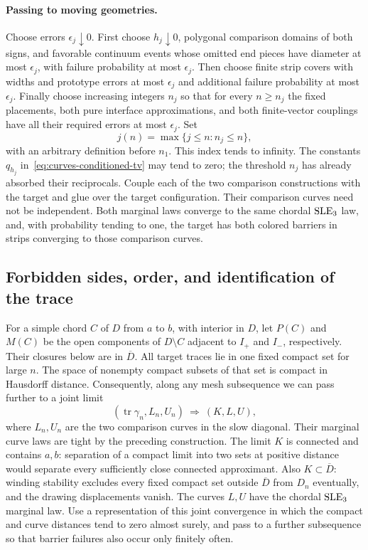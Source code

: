 \paragraph{Passing to moving geometries.}
Choose errors
$\epsilon_j\downarrow0$.  First choose $h_j\downarrow0$, polygonal
comparison domains of both signs, and favorable continuum events whose
omitted end pieces have diameter at most $\epsilon_j$, with failure
probability at most $\epsilon_j$.  Then choose finite strip covers with
widths and prototype errors at most $\epsilon_j$ and additional failure
probability at most $\epsilon_j$.  Finally choose increasing integers
$n_j$ so that for every $n\geq n_j$ the fixed placements, both pure
interface approximations, and both finite-vector couplings have all
their required errors at most $\epsilon_j$.  Set
\begin{equation}
 j(n)=\max\{j\leq n:n_j\leq n\},
 \label{eq:curves-slow-diagonal}
\end{equation}
with an arbitrary definition before $n_1$.  This index tends to infinity.
The constants $q_{h_j}$ in~\eqref{eq:curves-conditioned-tv} may tend to
zero; the threshold $n_j$ has already absorbed their reciprocals.
Couple each of the two comparison constructions with the target and
glue over the target configuration.  Their comparison curves need not
be independent.  Both marginal laws converge to the same chordal
$\operatorname{SLE}_3$ law, and, with probability tending to one, the target has both
colored barriers in strips converging to those comparison curves.

\subsection{Forbidden sides, order, and identification of the trace}

For a simple chord $C$ of $D$ from $a$ to $b$, with interior in $D$, let
$P(C)$ and $M(C)$ be the open components of $D\setminus C$ adjacent to
$I_+$ and $I_-$, respectively.  Their closures below are in $\overline D$.
All target traces lie in one fixed compact set for large $n$.  The space
of nonempty compact subsets of that set is compact in Hausdorff distance.
Consequently, along any mesh subsequence we can pass further to a joint
limit
\[
 (\operatorname{tr}\gamma_n,L_n,U_n)\ \Longrightarrow\ (K,L,U),
\]
where $L_n,U_n$ are the two comparison curves in the slow diagonal.
Their marginal curve laws are tight by the preceding construction.
The limit $K$ is connected and contains $a,b$: separation of a compact
limit into two sets at positive distance would separate every
sufficiently close connected approximant.  Also $K\subset\overline D$:
winding stability excludes every fixed compact set outside
$\overline D$ from $D_n$ eventually, and the drawing displacements
vanish.  The curves $L,U$ have the
chordal $\operatorname{SLE}_3$ marginal law.  Use a representation of this joint
convergence in which the compact and curve distances tend to zero
almost surely, and pass to a further subsequence so that barrier failures
also occur only finitely often.

